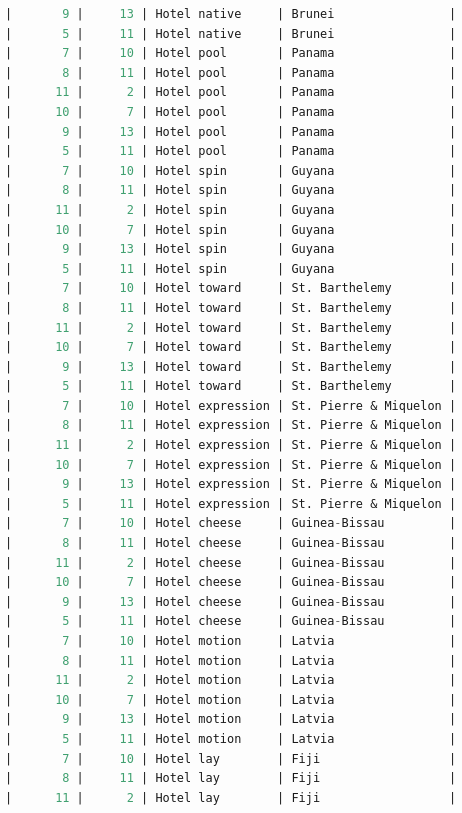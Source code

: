 \documentclass[11pt]{article}
\begin{document}
\begin{lstlisting}[language=sql]
|       9 |     13 | Hotel native     | Brunei                |
|       5 |     11 | Hotel native     | Brunei                |
|       7 |     10 | Hotel pool       | Panama                |
|       8 |     11 | Hotel pool       | Panama                |
|      11 |      2 | Hotel pool       | Panama                |
|      10 |      7 | Hotel pool       | Panama                |
|       9 |     13 | Hotel pool       | Panama                |
|       5 |     11 | Hotel pool       | Panama                |
|       7 |     10 | Hotel spin       | Guyana                |
|       8 |     11 | Hotel spin       | Guyana                |
|      11 |      2 | Hotel spin       | Guyana                |
|      10 |      7 | Hotel spin       | Guyana                |
|       9 |     13 | Hotel spin       | Guyana                |
|       5 |     11 | Hotel spin       | Guyana                |
|       7 |     10 | Hotel toward     | St. Barthelemy        |
|       8 |     11 | Hotel toward     | St. Barthelemy        |
|      11 |      2 | Hotel toward     | St. Barthelemy        |
|      10 |      7 | Hotel toward     | St. Barthelemy        |
|       9 |     13 | Hotel toward     | St. Barthelemy        |
|       5 |     11 | Hotel toward     | St. Barthelemy        |
|       7 |     10 | Hotel expression | St. Pierre & Miquelon |
|       8 |     11 | Hotel expression | St. Pierre & Miquelon |
|      11 |      2 | Hotel expression | St. Pierre & Miquelon |
|      10 |      7 | Hotel expression | St. Pierre & Miquelon |
|       9 |     13 | Hotel expression | St. Pierre & Miquelon |
|       5 |     11 | Hotel expression | St. Pierre & Miquelon |
|       7 |     10 | Hotel cheese     | Guinea-Bissau         |
|       8 |     11 | Hotel cheese     | Guinea-Bissau         |
|      11 |      2 | Hotel cheese     | Guinea-Bissau         |
|      10 |      7 | Hotel cheese     | Guinea-Bissau         |
|       9 |     13 | Hotel cheese     | Guinea-Bissau         |
|       5 |     11 | Hotel cheese     | Guinea-Bissau         |
|       7 |     10 | Hotel motion     | Latvia                |
|       8 |     11 | Hotel motion     | Latvia                |
|      11 |      2 | Hotel motion     | Latvia                |
|      10 |      7 | Hotel motion     | Latvia                |
|       9 |     13 | Hotel motion     | Latvia                |
|       5 |     11 | Hotel motion     | Latvia                |
|       7 |     10 | Hotel lay        | Fiji                  |
|       8 |     11 | Hotel lay        | Fiji                  |
|      11 |      2 | Hotel lay        | Fiji                  |

\end{lstlisting}
\end{document}
